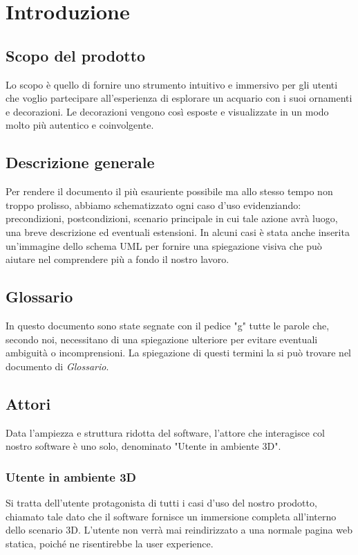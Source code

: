 \section{Introduzione}
\subsection{Scopo del prodotto}
Lo scopo è quello di fornire uno strumento intuitivo e immersivo per gli utenti che voglio partecipare all'esperienza di esplorare un acquario con i suoi ornamenti e decorazioni.
\newline
Le decorazioni vengono così esposte e visualizzate in un modo molto più autentico e coinvolgente.

\subsection{Descrizione generale}
Per rendere il documento il più esauriente possibile ma allo stesso tempo non troppo prolisso, abbiamo schematizzato ogni caso d'uso evidenziando:  precondizioni, postcondizioni, scenario principale in cui tale azione avrà luogo, una breve descrizione ed eventuali estensioni.\newline
In alcuni casi è stata anche inserita un'immagine dello schema UML per fornire una spiegazione visiva che può aiutare nel comprendere più a fondo il nostro lavoro.\newline

\subsection{Glossario}
In questo documento sono state segnate con il pedice "g" tutte le parole che, secondo noi, necessitano di una spiegazione ulteriore per evitare eventuali ambiguità o incomprensioni. La spiegazione di questi termini la si può trovare nel documento di \textit{Glossario}.

\subsection{Attori}
Data l'ampiezza e struttura ridotta del software, l'attore che interagisce col nostro software è uno solo, denominato "Utente in ambiente 3D". 

\subsubsection{Utente in ambiente 3D}
Si tratta dell'utente protagonista di tutti i casi d'uso del nostro prodotto, chiamato tale dato che il software fornisce un immersione completa all'interno dello scenario 3D. \newline
L'utente non verrà mai reindirizzato a una normale pagina web statica, poiché ne risentirebbe la user experience. 

